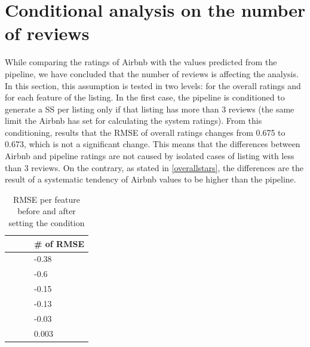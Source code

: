 \section{Conditional analysis on the number of reviews}
%
%
%
While comparing the ratings of Airbnb with the values predicted from the pipeline, we have concluded that the number of reviews is affecting the analysis. In this section, this assumption is tested in two levels: for the overall ratings and for each feature of the listing. In the first case, the pipeline is conditioned to generate a SS per listing only if that listing has more than 3 reviews (the same limit the Airbnb has set for calculating the system ratings). From this conditioning, results that the RMSE of overall ratings changes from 0.675 to 0.673, which is not a significant change. This means that the differences between Airbnb and pipeline ratings are not caused by isolated cases of listing with less than 3 reviews. On the contrary, as stated in \ref{overallstars}, the differences are the result of a systematic tendency of Airbnb values to be higher than the pipeline.
\begin{table}[h!]
\footnotesize 
\centering
\begin{tabular}{|m{2.1cm}|m{2.4cm}|m{2.6cm}|m{1.8cm}|}

\hline
\centering {\textbf{}}  & \centering {\textbf{RMSE }} & \centering {\textbf{RMSE AFTER}} & {\textbf{\# of RMSE}} \\

\hline
\centering {Accuracy}  & \centering {1.18} & \centering {0.8} &  {-0.38} \\ \hline

 \centering {Check-in} & \centering {1.52} & \centering  {0.92} & {-0.6}\\ \hline
 
 \centering {Cleanliness} & \centering {0.7} & \centering {0.55} & {-0.15}\\ \hline
 
\centering  {Communication} & \centering {0.68} & \centering {0.55} & {-0.13} \\ \hline

\centering {Location} & \centering {0.49} & \centering {0.46} & {-0.03}\\ \hline

\centering {Value} & \centering {0.711} & \centering {0.708} & {0.003}\\ \hline
\end{tabular}
\caption{RMSE per feature before and after setting the condition}
\label{res4}
\end{table}

